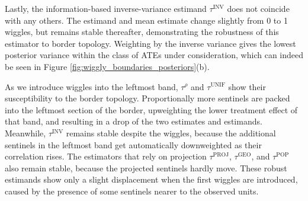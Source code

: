 \documentclass[letter,12pt]{article}
\newcommand{\unifavg}{\tau^{\mathrm{UNIF}}}
\newcommand{\invvar}{\tau^{\mathrm{INV}}}
\newcommand{\taurho}{\tau^{\rho}}
\newcommand{\tauproj}{\tau^{\mathrm{PROJ}}}
\newcommand{\taugeo}{\tau^{\mathrm{GEO}}}
\newcommand{\taupop}{\tau^{\mathrm{POP}}}
\begin{document}
Lastly, the information-based inverse-variance estimand \(\invvar\) does not coincide with any others.
The estimand and mean estimate change slightly from 0 to 1 wiggles, but remains stable thereafter, demonstrating the robustness of this estimator to border topology.
Weighting by the inverse variance gives the lowest posterior variance within the class of ATEs under consideration, which can indeed be seen in Figure \ref{fig:wiggly_boundaries_posteriors}(b).

As we introduce wiggles into the leftmost band,
\(\taurho\) and \(\unifavg\) show their susceptibility to the border topology.
Proportionally more sentinels are packed into the leftmost section of the border,
upweighting the lower treatment effect of that band,
and resulting in a drop of the two estimates and estimands.
Meanwhile, \(\invvar\) remains stable despite the wiggles,
because the additional sentinels in the leftmost
band get automatically downweighted as their correlation rises.
The estimators that rely on projection
\(\tauproj\), \(\taugeo\), and \(\taupop\) also remain stable,
because the projected sentinels hardly move.
These robust estimands show only a slight displacement when the first wiggles are introduced,
caused by the presence of some sentinels nearer to the observed units.
    
\end{document}
